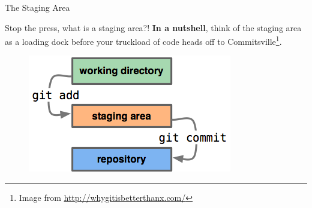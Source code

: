 \begin{frame}{The Staging Area}
    \begin{block}{Stop the press, what is a staging area?!}
    \textbf{In a nutshell}, think of the staging area as a loading dock before your truckload of code heads off to Commitsville\footnote{Image from \href{http://whygitisbetterthanx.com/}{http://whygitisbetterthanx.com/}}.
    \begin{figure}[ht]
        \centering
        \includegraphics[width=0.5\linewidth]{img/staging.png}
        \label{fig:figure3}
    \end{figure}
    \end{block}
\end{frame}
